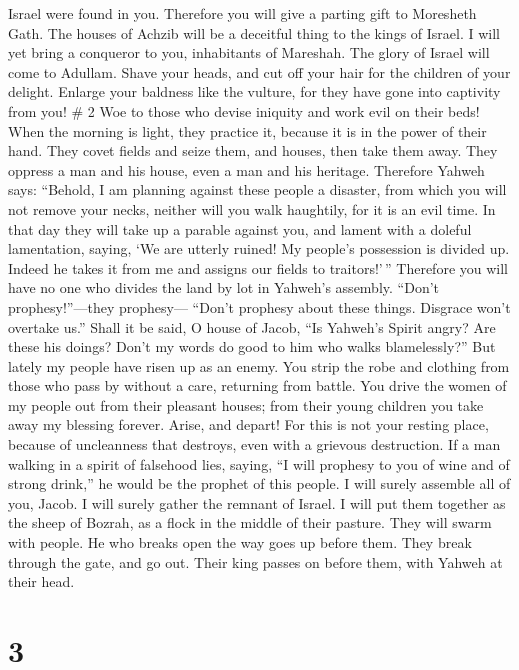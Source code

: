 Israel were found in you.  Therefore you will give a
parting gift to Moresheth Gath. The houses of Achzib will be a deceitful
thing to the kings of Israel.  I will yet bring a conqueror
to you, inhabitants of Mareshah. The glory of Israel will come to
Adullam.  Shave your heads, and cut off your hair for the
children of your delight. Enlarge your baldness like the vulture, for
they have gone into captivity from you! \# 2  Woe to those
who devise iniquity and work evil on their beds! When the morning is
light, they practice it, because it is in the power of their hand.
 They covet fields and seize them, and houses, then take
them away. They oppress a man and his house, even a man and his
heritage.  Therefore Yahweh says: ``Behold, I am planning
against these people a disaster, from which you will not remove your
necks, neither will you walk haughtily, for it is an evil time.
 In that day they will take up a parable against you, and
lament with a doleful lamentation, saying, `We are utterly ruined! My
people's possession is divided up. Indeed he takes it from me and
assigns our fields to traitors!'\,''  Therefore you will
have no one who divides the land by lot in Yahweh's assembly.
 ``Don't prophesy!''---they prophesy--- ``Don't prophesy
about these things. Disgrace won't overtake us.''  Shall it
be said, O house of Jacob, ``Is Yahweh's Spirit angry? Are these his
doings? Don't my words do good to him who walks blamelessly?''
 But lately my people have risen up as an enemy. You strip
the robe and clothing from those who pass by without a care, returning
from battle.  You drive the women of my people out from
their pleasant houses; from their young children you take away my
blessing forever.  Arise, and depart! For this is not your
resting place, because of uncleanness that destroys, even with a
grievous destruction.  If a man walking in a spirit of
falsehood lies, saying, ``I will prophesy to you of wine and of strong
drink,'' he would be the prophet of this people.  I will
surely assemble all of you, Jacob. I will surely gather the remnant of
Israel. I will put them together as the sheep of Bozrah, as a flock in
the middle of their pasture. They will swarm with people. 
He who breaks open the way goes up before them. They break through the
gate, and go out. Their king passes on before them, with Yahweh at their
head.

\hypertarget{section-1}{%
\section{3}\label{section-1}}

